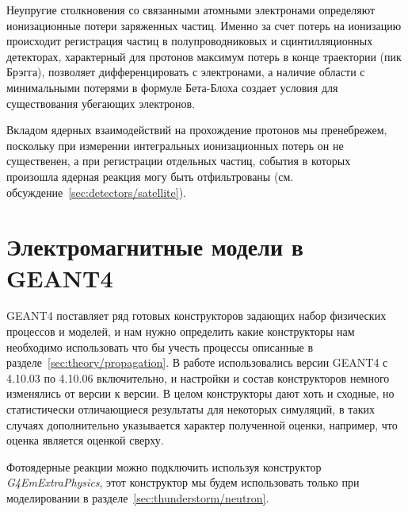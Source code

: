 Неупругие столкновения со связанными атомными электронами определяют ионизационные потери заряженных частиц. Именно за счет потерь на ионизацию происходит регистрация частиц в полупроводниковых и сцинтилляционных детекторах, характерный для протонов максимум потерь в конце траектории (пик Брэгга), позволяет дифференцировать с электронами, а наличие области с минимальными потерями в формуле Бета-Блоха создает условия для существования убегающих электронов.

Вкладом ядерных взаимодействий на прохождение протонов мы пренебрежем, поскольку при измерении интегральных ионизационных потерь он не существенен, а при регистрации отдельных частиц, события в которых произошла ядерная реакция могу быть отфильтрованы (см. обсуждение~\ref{sec:detectors/satellite}). 

\section{Электромагнитные модели в GEANT4 }\label{sec:theory/models}

GEANT4 поставляет ряд готовых конструкторов задающих набор физических процессов и моделей, и нам нужно определить какие конструкторы нам необходимо использовать что бы учесть процессы описанные в разделе~\ref{sec:theory/propagation}. В работе использовались версии GEANT4 с 4.10.03 по 4.10.06 включительно, и настройки и состав конструкторов немного изменялись от версии к версии. В целом конструкторы дают хоть и сходные, но статистически отличающиеся результаты для некоторых симуляций, в таких случаях дополнительно указывается характер полученной оценки, например, что оценка является оценкой сверху.

Фотоядерные реакции можно подключить используя конструктор \textit{G4EmExtraPhysics}, этот конструктор мы будем использовать только при моделировании в разделе~\ref{sec:thunderstorm/neutron}.

